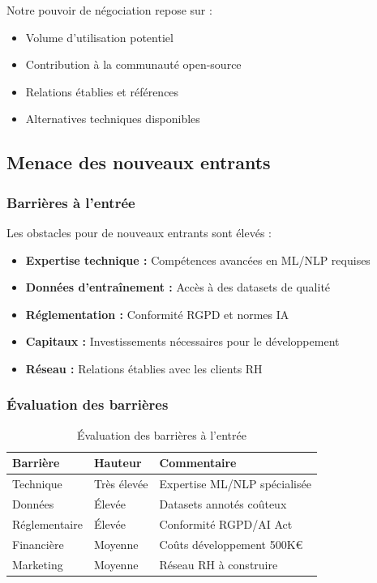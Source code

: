 \documentclass[12pt,a4paper]{report}
\begin{document}
Notre pouvoir de négociation repose sur :
\begin{itemize}
\item Volume d'utilisation potentiel
\item Contribution à la communauté open-source
\item Relations établies et références
\item Alternatives techniques disponibles
\end{itemize}

\subsection{Menace des nouveaux entrants}

\subsubsection{Barrières à l'entrée}

Les obstacles pour de nouveaux entrants sont élevés :
\begin{itemize}
\item \textbf{Expertise technique :} Compétences avancées en ML/NLP requises
\item \textbf{Données d'entraînement :} Accès à des datasets de qualité
\item \textbf{Réglementation :} Conformité RGPD et normes IA
\item \textbf{Capitaux :} Investissements nécessaires pour le développement
\item \textbf{Réseau :} Relations établies avec les clients RH
\end{itemize}

\subsubsection{Évaluation des barrières}

\begin{table}[H]
\centering
\caption{Évaluation des barrières à l'entrée}
\label{tab:barrieres}
\begin{tabular}{@{}lll@{}}
\toprule
Barrière & Hauteur & Commentaire \\
\midrule
Technique & Très élevée & Expertise ML/NLP spécialisée \\
Données & Élevée & Datasets annotés coûteux \\
Réglementaire & Élevée & Conformité RGPD/AI Act \\
Financière & Moyenne & Coûts développement 500K€ \\
Marketing & Moyenne & Réseau RH à construire \\
\bottomrule
\end{tabular}
\end{table}
\end{document}
